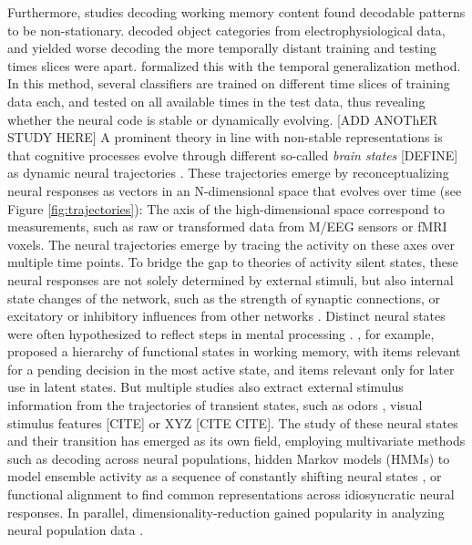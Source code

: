 Furthermore, studies decoding working memory content found decodable patterns to be non-stationary.
\citet{meyers2008dynamic} decoded object categories from electrophysiological data, and yielded worse decoding the more temporally distant training and testing times slices were apart.
\citet{king2014characterizing} formalized this with the temporal generalization method.
In this method, several classifiers are trained on different time slices of training data each, and tested on all available times in the test data, thus revealing whether the neural code is stable or dynamically evolving.
[ADD ANOThER STUDY HERE]
A prominent theory in line with non-stable representations is that cognitive processes evolve through different so-called \textit{brain states} [DEFINE] as dynamic neural trajectories \citep{buonomano2009state}.
These trajectories emerge by reconceptualizing neural responses as vectors in an N-dimensional space that evolves over time (see Figure \ref{fig:trajectories}):
The axis of the high-dimensional space correspond to measurements, such as raw or transformed data from M/EEG sensors or \gls{fMRI} voxels.
The neural trajectories emerge by tracing the activity on these axes over multiple time points.
To bridge the gap to theories of activity silent states, these neural responses are not solely determined by external stimuli, but also internal state changes of the network, such as the strength of synaptic connections, or excitatory or inhibitory influences from other networks \citep{buonomano2009state}.
Distinct neural states were often hypothesized to reflect steps in mental processing \citep[e.g.,][]{seidemann1996simultaneously}.
\citet{muhle2021hierarchy}, for example, proposed a hierarchy of functional states in working memory, with items relevant for a pending decision in the most active state, and items relevant only for later use in latent states.
But multiple studies also extract external stimulus information from the trajectories of transient states, such as odors \citep{mazor2005transient}, visual stimulus features [CITE] or XYZ [CITE CITE].
The study of these neural states and their transition has emerged as its own field, employing multivariate methods such as decoding across neural populations, hidden Markov models (HMMs) to model ensemble activity as a sequence of constantly shifting neural states \citep{rainer2000neural}, or functional alignment \citep{haxby2011common} to find common representations across idiosyncratic neural responses.
In parallel, dimensionality-reduction gained popularity in analyzing neural population data \citep{cunningham2014dimensionality}.
